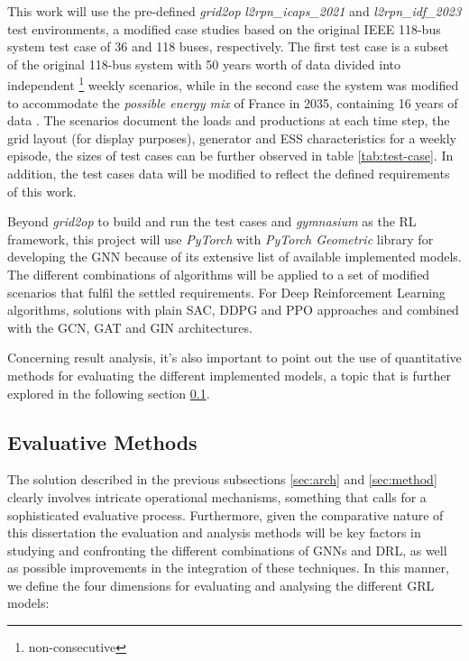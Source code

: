 This work will use the pre-defined \textit{grid2op} \textit{l2rpn\_icaps\_2021} and \textit{l2rpn\_idf\_2023} test environments, a modified case studies based on the original IEEE 118-bus system test case \cite{christiePowerSystemsTesta} of 36 and 118 buses, respectively. The first test case is a subset of the original 118-bus system with 50 years worth of data divided into independent \footnote{non-consecutive} weekly scenarios, while in the second case the system was modified to accommodate the \textit{possible energy mix} of France in 2035, containing 16 years of data \cite{rtefranceGrid2OpDocumentation}. The scenarios document the loads and productions at each time step, the grid layout (for display purposes), generator and \ac{ESS} characteristics \cite{rtefranceGrid2OpDocumentation} for a weekly episode, the sizes of test cases can be further observed in table \ref{tab:test-case}. In addition, the test cases data will be modified to reflect the defined requirements of this work. \par
Beyond \textit{grid2op} to build and run the test cases and \textit{gymnasium} as the RL framework, this project will use \textit{PyTorch} \cite{pytorchPyTorch} with \textit{PyTorch Geometric} \cite{pygteamPyGPytorch_geometric} library for developing the \ac{GNN} because of its extensive list of available implemented models. The different combinations of algorithms will be applied to a set of modified scenarios that fulfil the settled requirements. For Deep Reinforcement Learning algorithms, solutions with plain \ac{SAC}, \ac{DDPG} and \ac{PPO} approaches and combined with the \ac{GCN}, \ac{GAT} and \ac{GIN} architectures.  \par
Concerning result analysis, it's also important to point out the use of quantitative methods for evaluating the different implemented models, a topic that is further explored in the following section \ref{sec:eval-methods}.


\subsection{Evaluative Methods} \label{sec:eval-methods}

The solution described in the previous subsections \ref{sec:arch} and \ref{sec:method} clearly involves intricate operational mechanisms, something that calls for a sophisticated evaluative process. Furthermore, given the comparative nature of this dissertation the evaluation and analysis methods will be key factors in studying and confronting the different combinations of \acp{GNN} and \ac{DRL}, as well as possible improvements in the integration of these techniques.
In this manner, we define the four dimensions for evaluating and analysing the different \ac{GRL} models:

